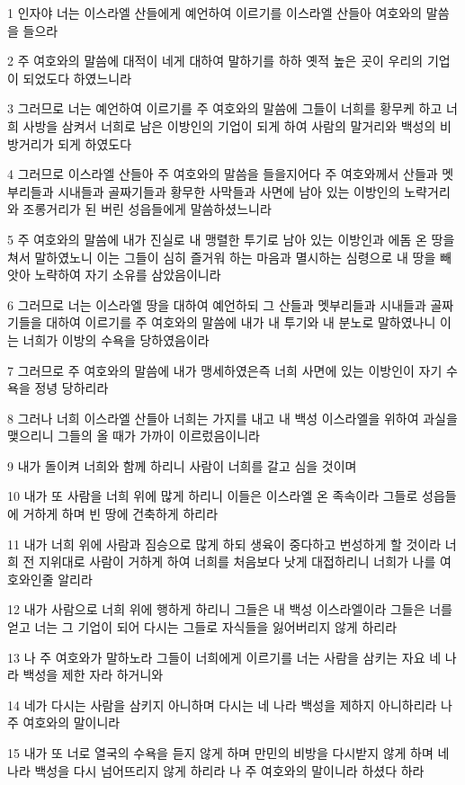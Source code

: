 \par 1 인자야 너는 이스라엘 산들에게 예언하여 이르기를 이스라엘 산들아 여호와의 말씀을 들으라
\par 2 주 여호와의 말씀에 대적이 네게 대하여 말하기를 하하 옛적 높은 곳이 우리의 기업이 되었도다 하였느니라
\par 3 그러므로 너는 예언하여 이르기를 주 여호와의 말씀에 그들이 너희를 황무케 하고 너희 사방을 삼켜서 너희로 남은 이방인의 기업이 되게 하여 사람의 말거리와 백성의 비방거리가 되게 하였도다
\par 4 그러므로 이스라엘 산들아 주 여호와의 말씀을 들을지어다 주 여호와께서 산들과 멧부리들과 시내들과 골짜기들과 황무한 사막들과 사면에 남아 있는 이방인의 노략거리와 조롱거리가 된 버린 성읍들에게 말씀하셨느니라
\par 5 주 여호와의 말씀에 내가 진실로 내 맹렬한 투기로 남아 있는 이방인과 에돔 온 땅을 쳐서 말하였노니 이는 그들이 심히 즐거워 하는 마음과 멸시하는 심령으로 내 땅을 빼앗아 노략하여 자기 소유를 삼았음이니라
\par 6 그러므로 너는 이스라엘 땅을 대하여 예언하되 그 산들과 멧부리들과 시내들과 골짜기들을 대하여 이르기를 주 여호와의 말씀에 내가 내 투기와 내 분노로 말하였나니 이는 너희가 이방의 수욕을 당하였음이라
\par 7 그러므로 주 여호와의 말씀에 내가 맹세하였은즉 너희 사면에 있는 이방인이 자기 수욕을 정녕 당하리라
\par 8 그러나 너희 이스라엘 산들아 너희는 가지를 내고 내 백성 이스라엘을 위하여 과실을 맺으리니 그들의 올 때가 가까이 이르렀음이니라
\par 9 내가 돌이켜 너희와 함께 하리니 사람이 너희를 갈고 심을 것이며
\par 10 내가 또 사람을 너희 위에 많게 하리니 이들은 이스라엘 온 족속이라 그들로 성읍들에 거하게 하며 빈 땅에 건축하게 하리라
\par 11 내가 너희 위에 사람과 짐승으로 많게 하되 생육이 중다하고 번성하게 할 것이라 너희 전 지위대로 사람이 거하게 하여 너희를 처음보다 낫게 대접하리니 너희가 나를 여호와인줄 알리라
\par 12 내가 사람으로 너희 위에 행하게 하리니 그들은 내 백성 이스라엘이라 그들은 너를 얻고 너는 그 기업이 되어 다시는 그들로 자식들을 잃어버리지 않게 하리라
\par 13 나 주 여호와가 말하노라 그들이 너희에게 이르기를 너는 사람을 삼키는 자요 네 나라 백성을 제한 자라 하거니와
\par 14 네가 다시는 사람을 삼키지 아니하며 다시는 네 나라 백성을 제하지 아니하리라 나 주 여호와의 말이니라
\par 15 내가 또 너로 열국의 수욕을 듣지 않게 하며 만민의 비방을 다시받지 않게 하며 네 나라 백성을 다시 넘어뜨리지 않게 하리라 나 주 여호와의 말이니라 하셨다 하라
